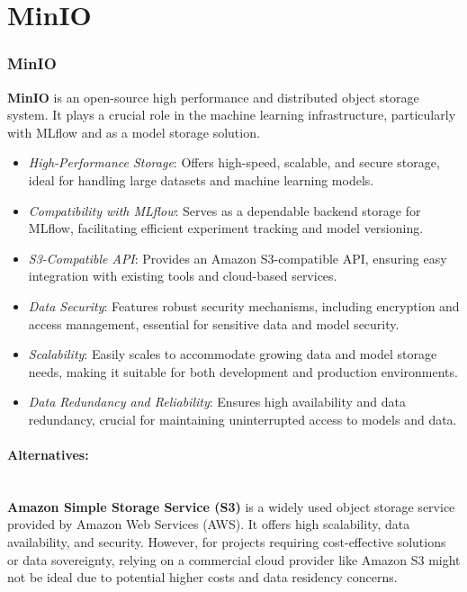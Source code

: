 \section{MinIO}
\label{section:minio}


\subsubsection{MinIO}

\textbf{MinIO} \cite{MinIODocs} is an open-source high performance and distributed object storage system. It plays a crucial role in the machine learning infrastructure, particularly with MLflow and as a model storage solution.

\begin{itemize}
    \item \textit{High-Performance Storage}: Offers high-speed, scalable, and secure storage, ideal for handling large datasets and machine learning models.
    \item \textit{Compatibility with MLflow}: Serves as a dependable backend storage for MLflow, facilitating efficient experiment tracking and model versioning.
    \item \textit{S3-Compatible API}: Provides an Amazon S3-compatible API, ensuring easy integration with existing tools and cloud-based services.
    \item \textit{Data Security}: Features robust security mechanisms, including encryption and access management, essential for sensitive data and model security.
    \item \textit{Scalability}: Easily scales to accommodate growing data and model storage needs, making it suitable for both development and production environments.
    \item \textit{Data Redundancy and Reliability}: Ensures high availability and data redundancy, crucial for maintaining uninterrupted access to models and data.
\end{itemize}

\paragraph{Alternatives:} \mbox{} \\ 

\textbf{Amazon Simple Storage Service (S3)} \cite{AmazonS3Docs} is a widely used object storage service provided by Amazon Web Services (AWS). It offers high scalability, data availability, and security. However, for projects requiring cost-effective solutions or data sovereignty, relying on a commercial cloud provider like Amazon S3 might not be ideal due to potential higher costs and data residency concerns. \\

